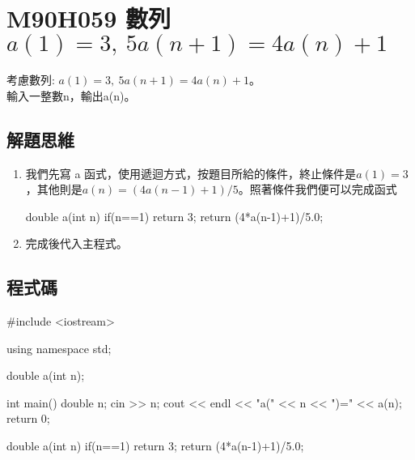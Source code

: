 \section{M90H059 數列 $a(1)=3,\ 5a(n+1)=4a(n)+1$}
考慮數列: $a(1)=3,\ 5a(n+1)=4a(n)+1$。\\ 
輸入一整數n，輸出a(n)。
\subsection{解題思維}

\begin{enumerate}
	\item
	我們先寫 a 函式，使用遞迴方式，按題目所給的條件，終止條件是$a(1)=3$，其他則是$a(n)=(4a(n-1)+1)/5$。照著條件我們便可以完成函式
	\begin{inside}
		double a(int n)
		{
			if(n==1) return 3;
			return (4*a(n-1)+1)/5.0;
		}			
	\end{inside}
	\item 
	完成後代入主程式。
\end{enumerate} 

\subsection{程式碼}
\begin{cppcode}
	#include <iostream>

	using namespace std;
	
	double a(int n);
	
	int main()
	{
		double n;
		cin >> n;
		cout << endl << "a(" << n << ")=" << a(n);
		return 0;
	}
	
	double a(int n) {
		if(n==1) return 3;
		return (4*a(n-1)+1)/5.0;
	}
\end{cppcode}
